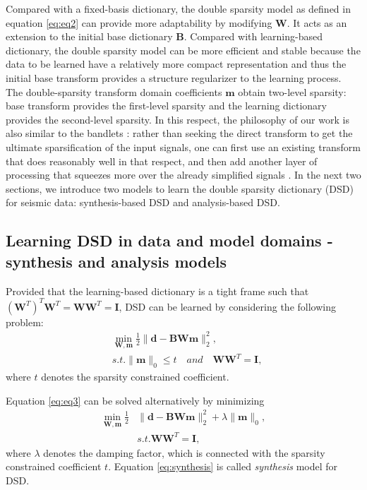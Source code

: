 Compared with a fixed-basis dictionary, the double sparsity model as defined in equation \ref{eq:eq2} can provide more adaptability by modifying $\mathbf{W}$. It acts as an extension to the initial base dictionary $\mathbf{B}$. Compared with learning-based dictionary, the double sparsity model can be more efficient and stable because the data to be learned have a relatively more compact representation and thus the initial base transform provides a structure regularizer to the learning process. The double-sparsity transform domain coefficients $\mathbf{m}$ obtain two-level sparsity: base transform provides the first-level sparsity and the learning dictionary provides the second-level sparsity.  In this respect, the philosophy of our work is also similar to the bandlets \cite[]{lepennec2005}: rather than seeking the direct transform to get the ultimate sparsification of the input signals, one can first use an existing transform that does reasonably well in that respect, and then add another layer of processing that squeezes more over the already simplified signals \cite[]{ophir2011}. In the next two sections, we introduce two models to learn the double sparsity dictionary (DSD) for seismic data: synthesis-based DSD and analysis-based DSD.

\subsection{Learning DSD in data and model domains - synthesis and analysis models}
Provided that the learning-based dictionary is a tight frame such that $(\mathbf{W}^T)^T\mathbf{W}^T=\mathbf{W}\mathbf{W}^T=\mathbf{I}$,
DSD can be learned by considering the following problem:
\begin{equation}
\label{eq:eq3}
\begin{split}
&\min_{\mathbf{W,m}}  \frac{1}{2}\parallel \mathbf{d} - \mathbf{BWm} \parallel_2^2, \\
&s.t. \parallel \mathbf{m} \parallel_0 \le t \quad  and \quad \mathbf{W}\mathbf{W}^T = \mathbf{I},
\end{split}
\end{equation}
where $t$ denotes the sparsity constrained coefficient.

Equation \ref{eq:eq3} can be solved alternatively by minimizing
\begin{equation}
\label{eq:synthesis}
\begin{split}
\min_{\mathbf{W},\mathbf{m}} \frac{1}{2}&\parallel \mathbf{d} - \mathbf{BWm}\parallel_2^2 + \lambda\parallel \mathbf{m} \parallel_0, \\
&s.t. \mathbf{W}\mathbf{W}^T = \mathbf{I},
\end{split}
\end{equation}
where $\lambda$ denotes the damping factor, which is connected with the sparsity constrained coefficient $t$. Equation \ref{eq:synthesis} is called \emph{synthesis} model for DSD.

